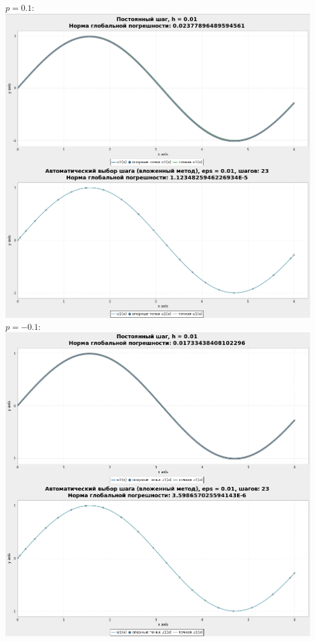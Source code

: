 \documentclass[a4paper,12pt]{article}
\begin{document}
\begin{flushleft}
\begin{enumerate}
      $p = 0.1:$\linebreak\linebreak\includegraphics{sc0_1.png}\linebreak\linebreak
      $p = -0.1:$\linebreak\linebreak\includegraphics{scm0_1.png}\linebreak\linebreak

\end{enumerate}
\end{flushleft}
\end{document}
